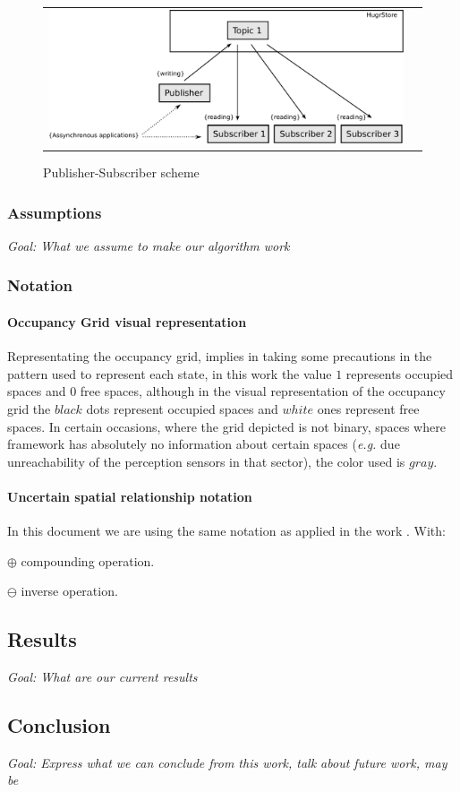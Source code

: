 \begin{figure}[H]
   \centering
     \begin{tabular}{lr}
       \includegraphics[scale=0.50]{img/fig:dds:hugr}
     \end{tabular}
   \caption{Publisher-Subscriber scheme}
   \label{fig:dds:hugr}
\end{figure}


\subsubsection*{Assumptions}

\textit{Goal: What we assume to make our algorithm work}

\subsubsection*{Notation}

\paragraph{Occupancy Grid visual representation}

Representating the occupancy grid, implies in taking some precautions in the pattern used to represent each state, in this work the value $1$ represents occupied spaces and $0$ free spaces, although in the visual representation of the occupancy grid the $black$ dots represent occupied spaces and $white$ ones represent free spaces. In certain occasions, where the grid depicted is not binary, spaces where framework has absolutely no information about certain spaces (\textit{e.g.} due unreachability of the perception sensors in that sector), the color used is $gray$.

\paragraph{Uncertain spatial relationship notation} In this document we are using the same notation as applied in the work \cite{Wang04a}. With:

$\oplus$ compounding operation.

$\ominus$ inverse operation.

\subsection{Results}

\textit{Goal: What are our current results}

\subsection{Conclusion}

\textit{Goal: Express what we can conclude from this work, talk about future work, may be}